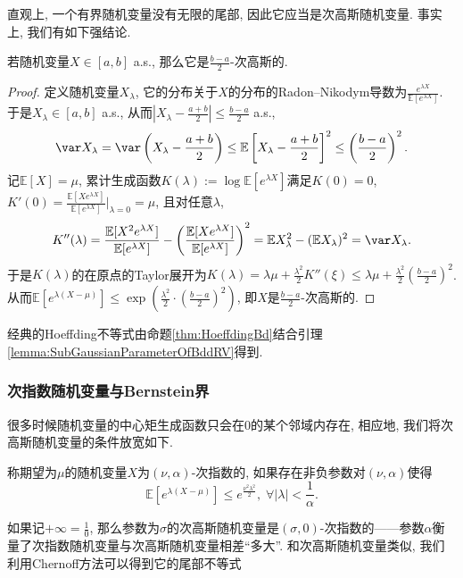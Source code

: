直观上, 一个有界随机变量没有无限的尾部, 因此它应当是次高斯随机变量. 
事实上, 我们有如下强结论. 
\begin{lemma}[有界随机变量]\label{lemma:SubGaussianParameterOfBddRV}
	若随机变量$X \in [a, b]$ a.s., 那么它是$\frac{b-a}{2}$-次高斯的. 
\end{lemma}
\begin{proof}
	定义随机变量$X_{\lambda}$, 它的分布关于$X$的分布的Radon–Nikodym导数为$\frac{e^{\lambda X}}{\mathbb{E}[e^{\lambda X}]}$. 
	于是$X_{\lambda} \in [a, b]$ a.s., 从而$\left|X_{\lambda} - \frac{a+b}{2} \right| \leq \frac{b-a}{2}$ a.s., 
	\begin{equation*}
		\var X_{\lambda}
		= \var \left(X_{\lambda} - \frac{a+b}{2} \right) 
		\leq \mathbb{E}\left[X_{\lambda} - \frac{a+b}{2} \right]^2 
		\leq \left(\frac{b-a}{2}\right)^2. 
	\end{equation*}
	记$\mathbb{E}[X] = \mu$, 累计生成函数$K(\lambda) := \log \mathbb{E}[e^{\lambda X}]$满足$K(0) = 0$, $K'(0) = \frac{\mathbb{E}[X e^{\lambda X}]}{\mathbb{E}[e^{\lambda X}]} \big|_{\lambda = 0} = \mu$, 且对任意$\lambda$,  
	\begin{equation*}
		K''(\lambda) 
		= \frac{\mathbb{E}[X^2 e^{\lambda X}]}{\mathbb{E}[e^{\lambda X}]} - \left( \frac{\mathbb{E}[X e^{\lambda X}]}{\mathbb{E}[e^{\lambda X}]} \right)^2
		= \mathbb{E}X_{\lambda}^2 - (\mathbb{E}X_{\lambda})^2
		= \var X_{\lambda}.  
	\end{equation*}
	于是$K(\lambda)$的在原点的Taylor展开为$K(\lambda) = \lambda \mu + \frac{\lambda^2}{2} K''(\xi) \leq \lambda \mu + \frac{\lambda^2}{2} \left(\frac{b-a}{2}\right)^2$. 
	从而$\mathbb{E}[e^{\lambda(X - \mu)}] \leq \exp\left(\frac{\lambda^2}{2} \cdot \left(\frac{b-a}{2}\right)^2\right)$, 即$X$是$\frac{b-a}{2}$-次高斯的. 
\end{proof}

\begin{corollary}
	经典的Hoeffding不等式由命题\ref{thm:HoeffdingBd}结合引理\ref{lemma:SubGaussianParameterOfBddRV}得到. 
\end{corollary}


\subsubsection{次指数随机变量与Bernstein界}

很多时候随机变量的中心矩生成函数只会在$0$的某个邻域内存在, 相应地, 我们将次高斯随机变量的条件放宽如下. 
\begin{definition}[次指数随机变量]
	称期望为$\mu$的随机变量$X$为$(\nu, \alpha)$-次指数的, 如果存在非负参数对$(\nu, \alpha)$使得
	\begin{equation*}
		\mathbb{E}[ e^{\lambda(X - \mu)} ] 
		\leq e^{\frac{\nu^2 \lambda^2}{2}},\; 
		\forall |\lambda| < \frac{1}{\alpha}. 
	\end{equation*}
\end{definition}
\noindent
如果记$+\infty = \frac10$, 那么参数为$\sigma$的次高斯随机变量是$(\sigma, 0)$-次指数的——参数$\alpha$衡量了次指数随机变量与次高斯随机变量相差“多大”. 
和次高斯随机变量类似, 我们利用Chernoff方法可以得到它的尾部不等式

